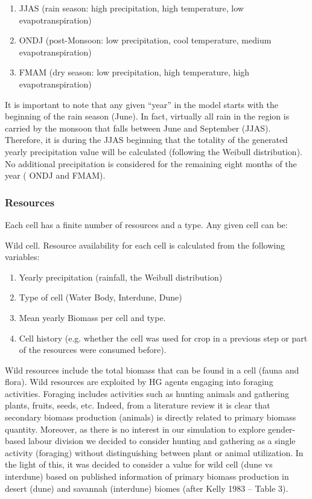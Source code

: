\begin{enumerate}
\item JJAS (rain season: high precipitation, high temperature, low evapotranspiration)
\item ONDJ (post-Monsoon: low precipitation, cool temperature, medium evapotranspiration)
\item FMAM (dry season: low precipitation, high temperature, high evapotranspiration)
\end{enumerate}

It is important to note that any given “year” in the model starts with the beginning of the rain season
(June). In fact, virtually all rain in the region is carried by the monsoon that falls between June and
September (JJAS). Therefore, it is during the JJAS beginning that the totality of the generated yearly
precipitation value will be calculated (following the Weibull distribution). No additional precipitation is
considered for the remaining eight months of the year ( ONDJ and FMAM).


\subsubsection{Resources}
Each cell has a finite number of resources and a type. Any given cell can be:

Wild cell. Resource availability for each cell is calculated from the following variables:

\begin{enumerate}
\item Yearly precipitation (rainfall, the Weibull distribution)
\item Type of cell (Water Body, Interdune, Dune)
\item Mean yearly Biomass per cell and type.
\item Cell history (e.g. whether the cell was used for crop in a previous step or part of the resources
were consumed before).
\end{enumerate}

Wild resources include the total biomass that can be found in a cell (fauna and flora). Wild resources
are exploited by HG agents engaging into foraging activities. Foraging includes activities such as
hunting animals and gathering plants, fruits, seeds, etc. Indeed, from a literature review it is clear that
secondary biomass production (animals) is directly related to primary biomass quantity. Moreover, as
there is no interest in our simulation to explore gender-based labour division we decided to consider
hunting and gathering as a single activity (foraging) without distinguishing between plant or animal
utilization. In the light of this, it was decided to consider a value for wild cell (dune vs interdune) based
on published information of primary biomass production in desert (dune) and savannah (interdune)
biomes (after Kelly 1983 – Table 3).

